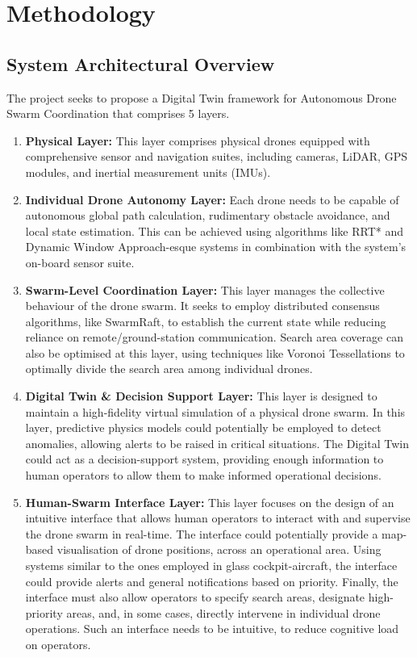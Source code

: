 \section{Methodology}\label{sec:methodology}

\subsection{System Architectural Overview}\label{subsec:system-architectural-overview}
The project seeks to propose a Digital Twin framework for Autonomous Drone Swarm Coordination that comprises 5 layers.

\begin{enumerate}
    \item \textbf{Physical Layer:} This layer comprises physical drones equipped with comprehensive sensor and navigation suites, including cameras, LiDAR, GPS modules, and inertial measurement units (IMUs).

    \item \textbf{Individual Drone Autonomy Layer:} Each drone needs to be capable of autonomous global path calculation, rudimentary obstacle avoidance, and local state estimation.
    This can be achieved using algorithms like RRT* and Dynamic Window Approach-esque systems in combination with the system's on-board sensor suite.

    \item \textbf{Swarm-Level Coordination Layer:} This layer manages the collective behaviour of the drone swarm.
    It seeks to employ distributed consensus algorithms, like SwarmRaft, to establish the current state while reducing reliance on remote/ground-station communication.
    Search area coverage can also be optimised at this layer, using techniques like Voronoi Tessellations to optimally divide the search area among individual drones.

    \item \textbf{Digital Twin \& Decision Support Layer:} This layer is designed to maintain a high-fidelity virtual simulation of a physical drone swarm.
    In this layer, predictive physics models could potentially be employed to detect anomalies, allowing alerts to be raised in critical situations.
    The Digital Twin could act as a decision-support system, providing enough information to human operators to allow them to make informed operational decisions.

    \item \textbf{Human-Swarm Interface Layer:} This layer focuses on the design of an intuitive interface that allows human operators to interact with and supervise the drone swarm in real-time.
    The interface could potentially provide a map-based visualisation of drone positions, across an operational area.
    Using systems similar to the ones employed in glass cockpit-aircraft, the interface could provide alerts and general notifications based on priority.
    Finally, the interface must also allow operators to specify search areas, designate high-priority areas, and, in some cases, directly intervene in individual drone operations.
    Such an interface needs to be intuitive, to reduce cognitive load on operators.
\end{enumerate}

